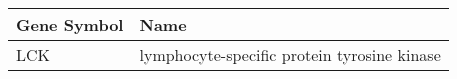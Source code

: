 \begin{tabular}{ll}
\toprule
Gene Symbol &                                        Name \\
\midrule
        LCK & lymphocyte-specific protein tyrosine kinase \\
\bottomrule
\end{tabular}
